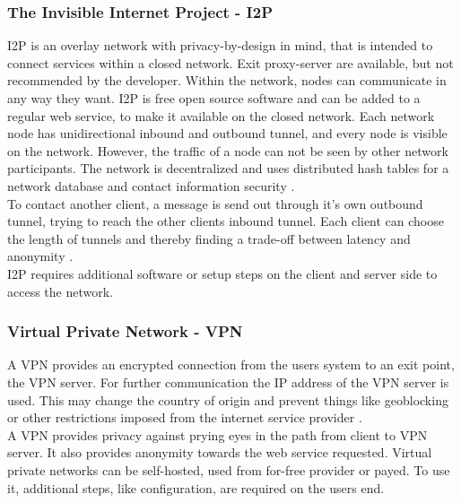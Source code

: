     
    
    \subsubsection{The Invisible Internet Project - I2P}
        I2P is an overlay network with privacy-by-design in mind, that is intended to connect services within a closed network.
        Exit proxy-server are available, but not recommended by the developer. Within the network, nodes can communicate in any way they want. I2P is free open source software and can be added to a regular web service, to make it available on the closed network. Each network node has unidirectional inbound and outbound tunnel, and every node is visible on the network. However, the traffic of a node can not be seen by other network participants. The network is decentralized and uses distributed hash tables for a network database and contact information security \cite{i2p_intro_2014}.\\
        To contact another client, a message is send out through it's own outbound tunnel, trying to reach the other clients inbound tunnel. Each client can choose the length of tunnels and thereby finding a trade-off between latency and anonymity \cite{anoncoin_i2p_2018}.\\
        I2P requires additional software or setup steps on the client and server side to access the network.\\
        
        
        
    
    \subsubsection{Virtual Private Network - VPN}
        A VPN provides an encrypted connection from the users system to an exit point, the VPN server. For further communication the IP address of the VPN server is used. This may change the country of origin and prevent things like geoblocking or other restrictions imposed from the internet service provider \cite{microsoft_virtual_2009}.\\
        A VPN provides privacy against prying eyes in the path from client to VPN server. It also provides anonymity towards the web service requested. Virtual private networks can be self-hosted, used from for-free provider or payed. To use it, additional steps, like configuration, are required on the users end.\\

